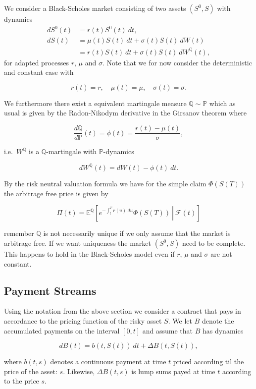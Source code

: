 \documentclass[a4paper,10pt,openany]{book}
\begin{document}
We consider a Black-Scholes market consisting of two assets \((S^0,S)\) with dynamics
\begin{align*}
dS^0(t)&=r(t)S^0(t)\ dt,\\
dS(t)&=\mu(t)S(t)\ dt+\sigma(t) S(t)\ dW(t)\\
&=r(t)S(t)\ dt + \sigma(t)S(t)\ dW^{\mathbb Q}(t),
\end{align*}
for adapted processes \(r\), \(\mu\) and \(\sigma\). Note that we for now consider the deterministic and constant case with

\[
r(t)=r,\quad\mu(t)=\mu, \quad\sigma(t)=\sigma.
\]

We furthermore there exist a equivalent martingale measure \(\mathbb Q\sim \mathbb P\) which as usual is given by the Radon-Nikodym derivative in the Girsanov theorem where

\[
\frac{d\mathbb Q}{d\mathbb P}(t)=\phi(t)=\frac{r(t)-\mu(t)}{\sigma},
\]

i.e.~\(W^{\mathbb Q}\) is a \(\mathbb Q\)-martingale with \(\mathbb P\)-dynamics

\[
dW^{\mathbb Q}(t)=dW(t)-\phi(t)\ dt.
\]

By the risk neutral valuation formula we have for the simple claim \(\Phi(S(T))\) the arbitrage free price is given by

\[
\Pi(t)=\mathbb E^{\mathbb Q}\left[\left.e^{-\int_t^Tr(u)\ du}\Phi(S(T))\ \right\vert\ \mathcal F(t)\right]
\]

remember \(\mathbb Q\) is not necessarily unique if we only assume that the market is arbitrage free. If we want uniqueness the market \((S^0,S)\) need to be complete. This happens to hold in the Black-Scholes model even if \(r\), \(\mu\) and \(\sigma\) are not constant.

\hypertarget{payment-streams}{%
\subsection{Payment Streams}\label{payment-streams}}

Using the notation from the above section we consider a contract that pays in accordance to the pricing function of the risky asset \(S\). We let \(B\) denote the accumulated payments on the interval \([0,t]\) and assume that \(B\) has dynamics

\[
dB(t)=b(t,S(t))\ dt+\Delta B(t,S(t)),
\]

where \(b(t,s)\) denotes a continuous payment at time \(t\) priced according til the price of the asset: \(s\). Likewise, \(\Delta B(t,s)\) is lump sums payed at time \(t\) according to the price \(s\).
\end{document}
